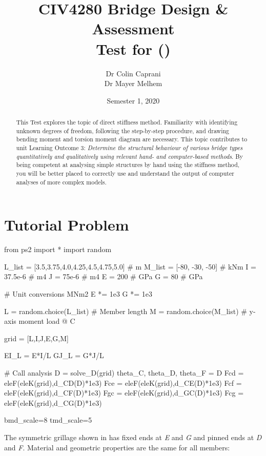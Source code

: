 \documentclass[a4paper,11pt]{article}
\title{CIV4280 Bridge Design \& Assessment\\Test for \VAR{FULL-NAME} (\VAR{STUDENT-ID})}
\date{Semester 1, 2020}
\author{Dr Colin Caprani\\Dr Mayer Melhem}
\begin{document}
\maketitle

\begin{abstract}
	This Test explores the topic of direct stiffness method. Familiarity with identifying unknown degrees of freedom, following the step-by-step procedure, and drawing bending moment and torsion moment diagram are necessary. This topic contributes to unit Learning Outcome 3: \textit{Determine the structural behaviour of various bridge types quantitatively and qualitatively using relevant hand- and computer-based methods}. By being competent at analysing simple structures by hand using the stiffness method, you will be better placed to correctly use and understand the output of computer analyses of more complex models.
\end{abstract}

\newpage

\section{Tutorial Problem}

\begin{pycode}
from ps2 import *
import random

L_list = [3.5,3.75,4.0,4.25,4.5,4.75,5.0]  # m
M_list = [-80, -30, -50]	# kNm
I = 37.5e-6 	# m4
J = 75e-6   	# m4
E = 200     	# GPa
G = 80      	# GPa

# Unit conversions MNm2
E *= 1e3
G *= 1e3

L = random.choice(L_list) 		# Member length
M = random.choice(M_list) 		# y-axis moment load @ C

grid = [L,I,J,E,G,M]

EI_L = E*I/L
GJ_L = G*J/L

# Call analysis
D = solve_D(grid)
theta_C, theta_D, theta_F = D
Fcd = eleF(eleK(grid),d_CD(D)*1e3)
Fce = eleF(eleK(grid),d_CE(D)*1e3)
Fcf = eleF(eleK(grid),d_CF(D)*1e3)
Fgc = eleF(eleK(grid),d_GC(D)*1e3)
Fcg = eleF(eleK(grid),d_CG(D)*1e3)

bmd_scale=8
tmd_scale=5
\end{pycode}

The symmetric grillage shown in  has fixed ends at \emph{E} and \emph{G} and
pinned ends at \emph{D} and \emph{F}. Material and geometric properties are the same for all members: 
\end{document}

